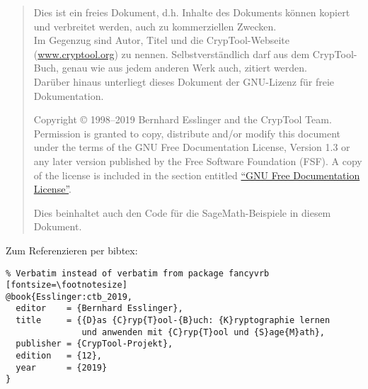 \VerbatimFootnotes
\renewcommand\footnoterule{
\vspace{2em}%
\hrule width .4\columnwidth
\vspace{4pt}
}%
\frontmatter %
\maketitle

\begin{quote}
Dies ist ein freies Dokument, d.h. Inhalte des Dokuments können kopiert und
verbreitet werden, auch zu kommerziellen Zwecken.\\
Im Gegenzug sind Autor, Titel und die CrypTool-Webseite (\url{www.cryptool.org}) zu
nennen. Selbstverständlich darf aus dem CrypTool-Buch, genau wie aus jedem
anderen Werk auch, zitiert werden. \\
Darüber hinaus unterliegt dieses Dokument der GNU-Lizenz für freie
Dokumentation.

    Copyright \copyright{} 1998--2019 Bernhard Esslinger and the
    CrypTool Team. Permission is granted to copy,
    distribute and/or modify this document under the terms of the GNU
    Free Documentation License, Version 1.3 or any later version
    published by the Free Software Foundation (FSF). A copy of
    the license is included in the section entitled
    \hyperlink{appendix-GNU-fdl}{``GNU Free Documentation License''}.

    Dies beinhaltet auch den Code für die SageMath-Beispiele in diesem Dokument.
\end{quote}



\vspace{70pt}\noindent Zum Referenzieren per bibtex:
\begin{Verbatim}% Verbatim instead of verbatim from package fancyvrb
[fontsize=\footnotesize]
@book{Esslinger:ctb_2019,
  editor    = {Bernhard Esslinger},
  title     = {{D}as {C}ryp{T}ool-{B}uch: {K}ryptographie lernen
               und anwenden mit {C}ryp{T}ool und {S}age{M}ath},
  publisher = {CrypTool-Projekt},
  edition   = {12},
  year      = {2019}
}
\end{Verbatim}




